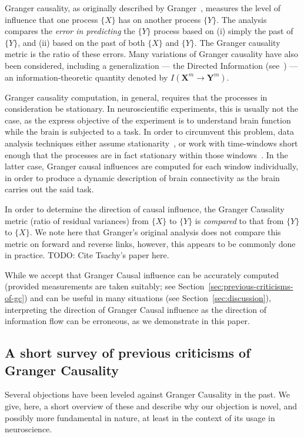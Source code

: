 \documentclass[conference]{IEEEtran}
\newcommand{\m}[1]{\mathbf{#1}^m}
\begin{document}
Granger causality, as originally described by Granger~\cite{Granger1969InvestigatingCausal}, measures the level of influence that one process $\{X\}$ has on another process $\{Y\}$. The analysis compares the \textit{error in predicting} the $\{Y\}$ process based on (i) simply the past of $\{Y\}$, and (ii) based on the past of both $\{X\}$ and $\{Y\}$. The Granger causality metric is the ratio of these errors. Many variations of Granger causality have also been considered, including a generalization --- the Directed Information (see~\cite{MasseyCausality,quinn,weissman}) --- an information-theoretic quantity denoted by $I(\m{X}\to\m{Y})$.

Granger causality computation, in general, requires that the processes in consideration be stationary. In neuroscientific experiments, this is usually not the case, as the express objective of the experiment is to understand brain function while the brain is subjected to a task. In order to circumvent this problem, data analysis techniques either assume stationarity~\cite{Brovelli2004BetaOscillations}, or work with time-windows short enough that the processes are in fact stationary within those windows~\cite{Ding2006GrangerCausality}. In the latter case, Granger causal influences are computed for each window individually, in order to produce a dynamic description of brain connectivity as the brain carries out the said task.

In order to determine the direction of causal influence, the Granger Causality metric (ratio of residual variances) from $\{X\}$ to $\{Y\}$ is \emph{compared} to that from $\{Y\}$ to $\{X\}$. We note here that Granger's original analysis does not compare this metric on forward and reverse links, however, this appears to be commonly done in practice. {\color{red} TODO: Cite Tsachy's paper here.}

While we accept that Granger Causal influence can be accurately computed (provided measurements are taken suitably; see Section~\ref{sec:previous-criticisms-of-gc}) and can be useful in many situations (see Section~\ref{sec:discussion}), interpreting the direction of Granger Causal influence as the direction of information flow can be erroneous, as we demonstrate in this paper.

\subsection{A short survey of previous criticisms of Granger Causality}

Several objections have been leveled against Granger Causality in the past. We give, here, a short overview of these and describe why our objection is novel, and possibly more fundamental in nature, at least in the context of its usage in neuroscience.
\end{document}
